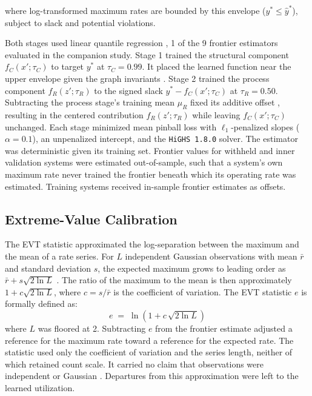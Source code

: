 \documentclass{article}
\begin{document}
where log-transformed maximum rates are bounded by this envelope ($y^* \leq \widehat{y}^*$), subject to slack and potential violations.

Both stages used linear quantile regression \citep{ref22}, 1 of the 9 frontier estimators evaluated in the companion study. Stage 1 trained the structural component $f_C(x'; \tau_C)$ to target $y^{*}$ at $\tau_C = 0.99$. It placed the learned function near the upper envelope given the graph invariants \citep{ref29}. Stage 2 trained the process component $f_R(z'; \tau_R)$ to the signed slack $y^{*} - f_C(x'; \tau_C)$ at $\tau_R = 0.50$. Subtracting the process stage's training mean $\mu_R$ fixed its additive offset \citep{ref67}, resulting in the centered contribution $f_R(z'; \tau_R)$ while leaving $f_C(x'; \tau_C)$ unchanged. Each stage minimized mean pinball loss with $\ell_1$-penalized slopes ($\alpha = 0.1$), an unpenalized intercept, and the \texttt{HiGHS 1.8.0} solver. The estimator was deterministic given its training set. Frontier values for withheld and inner validation systems were estimated out-of-sample, such that a system's own maximum rate never trained the frontier beneath which its operating rate was estimated. Training systems received in-sample frontier estimates as offsets.

\subsection*{Extreme-Value Calibration}
\label{sec:evt}
The EVT statistic approximated the log-separation between the maximum and the mean of a rate series. For $L$ independent Gaussian observations with mean $\bar{r}$ and standard deviation $s$, the expected maximum grows to leading order as $\bar{r} + s\sqrt{2 \ln L}$ \citep{ref58,ref179,ref181}. The ratio of the maximum to the mean is then approximately $1 + c\sqrt{2 \ln L}$, where $c = s/\bar{r}$ is the coefficient of variation. The EVT statistic $e$ is formally defined as:
\begin{equation}
    e \;=\; \ln\!\left(1 + c\,\sqrt{2 \ln L}\right)
\label{eq:evt}
\end{equation}
where $L$ was floored at 2. Subtracting $e$ from the frontier estimate adjusted a reference for the maximum rate toward a reference for the expected rate. The statistic used only the coefficient of variation and the series length, neither of which retained count scale. It carried no claim that observations were independent or Gaussian \citep{ref180,ref123}. Departures from this approximation were left to the learned utilization.
\end{document}

